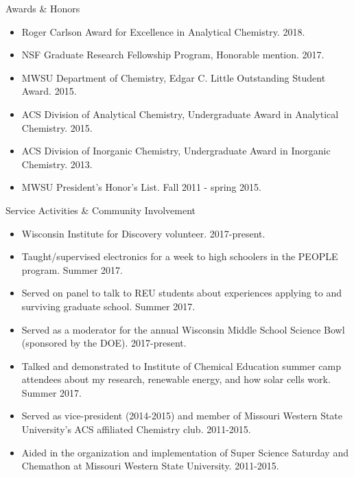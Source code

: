 \documentclass{resume} %
\begin{document}
\begin{rSection}{Awards \& Honors}

\begin{itemize}[leftmargin = 0 pt]
	\item Roger Carlson Award for Excellence in Analytical Chemistry. 2018.
	\item NSF Graduate Research Fellowship Program, Honorable mention. 2017.
	\item MWSU Department of Chemistry, Edgar C. Little Outstanding Student Award. 2015.
	\item ACS Division of Analytical Chemistry, Undergraduate Award in Analytical Chemistry. 2015. 
	\item ACS Division of Inorganic Chemistry, Undergraduate Award in Inorganic Chemistry. 2013.
	\item MWSU President’s Honor’s List. Fall 2011 - spring 2015.
\end{itemize}

\end{rSection}



\begin{rSection}{Service Activities \& Community Involvement}

\begin{itemize}[leftmargin = 0 pt]
	\item Wisconsin Institute for Discovery volunteer. 2017-present. 
	\item Taught/supervised electronics for a week to high schoolers in the PEOPLE program. Summer 2017.
	\item Served on panel to talk to REU students about experiences applying to and surviving graduate school. Summer 2017.
	\item Served as a moderator for the annual Wisconsin Middle School Science Bowl (sponsored by the DOE). 2017-present.
	\item Talked and demonstrated to Institute of Chemical Education summer camp attendees about my research, renewable energy, and how solar cells work. Summer 2017.  
	\item Served as vice-president (2014-2015) and member of Missouri Western State University's ACS affiliated Chemistry club. 2011-2015.
	\item Aided in the organization and implementation of Super Science Saturday and Chemathon at Missouri Western State University. 2011-2015.	
\end{itemize}

\end{rSection}
\end{document}
